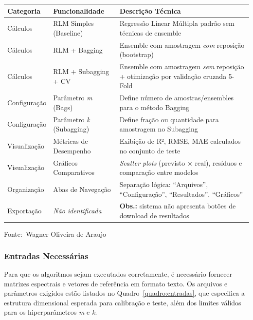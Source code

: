 \documentclass[12pt,a4paper]{article}
\newcommand{\oautor}{Wagner Oliveira de Araujo}
\begin{document}
\begin{quadro}[ht]
\centering
\small
\caption{Inventário das funções do sistema}
\label{quadro:funcoes}
\begin{threeparttable}
\begin{tabularx}{\textwidth}{|l|l|X|} \hline
\textbf{Categoria} & \textbf{Funcionalidade} & \textbf{Descrição Técnica} \\ \hline
Cálculos & RLM Simples (Baseline) & Regressão Linear Múltipla padrão sem técnicas de ensemble \\ \hline
Cálculos & RLM + Bagging & Ensemble com amostragem \textit{com} reposição (bootstrap) \\ \hline
Cálculos & RLM + Subagging + CV & Ensemble com amostragem \textit{sem} reposição + otimização por validação cruzada 5-Fold \\ \hline
Configuração & Parâmetro \textit{m} (Bags) & Define número de amostras/ensembles para o método Bagging \\ \hline
Configuração & Parâmetro \textit{k} (Subagging) & Define fração ou quantidade para amostragem no Subagging \\ \hline
Visualização & Métricas de Desempenho & Exibição de R², RMSE, MAE calculados no conjunto de teste \\ \hline
Visualização & Gráficos Comparativos & \textit{Scatter plots} (previsto $\times$ real), resíduos e comparação entre modelos \\ \hline
Organização & Abas de Navegação & Separação lógica: ``Arquivos'', ``Configuração'', ``Resultados'', ``Gráficos'' \\ \hline
Exportação & \textit{Não identificada} & \textbf{Obs.:} sistema não apresenta botões de download de resultados \\ \hline
\end{tabularx}
\begin{tablenotes}[flushleft]
\footnotesize
\item Fonte:~\oautor
\end{tablenotes}
\end{threeparttable}
\end{quadro}

\subsubsection{Entradas Necessárias}

Para que os algoritmos sejam executados corretamente, é necessário fornecer matrizes espectrais e vetores de referência em formato texto. Os arquivos e parâmetros exigidos estão listados no Quadro~\ref{quadro:entradas}, que especifica a estrutura dimensional esperada para calibração e teste, além dos limites válidos para os hiperparâmetros \textit{m} e \textit{k}.
\end{document}
